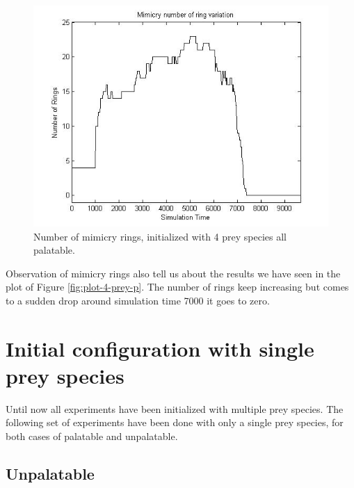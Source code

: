 \begin{figure}[H]
	\centering
	\includegraphics[scale=0.50]{images/ringSize8k-4Prey-p}
	\caption[Number of mimicry rings (4 prey species all palatable)]{Number of mimicry rings, initialized with 4 prey species all palatable.}
	\label{fig:ringSize8k-4-Prey-p}
\end{figure}

Observation of mimicry rings also tell us about the results we have seen in the plot of Figure \ref{fig:plot-4-prey-p}. The number of rings keep increasing but comes to a sudden drop around simulation time 7000 it goes to zero.

\section{Initial configuration with single prey species}
Until now all experiments have been initialized with multiple prey species. The following set of experiments have been done with only a single prey species, for both cases of palatable and unpalatable.

\subsection{Unpalatable}
\label{subsec:single-prey-unpalatable}

